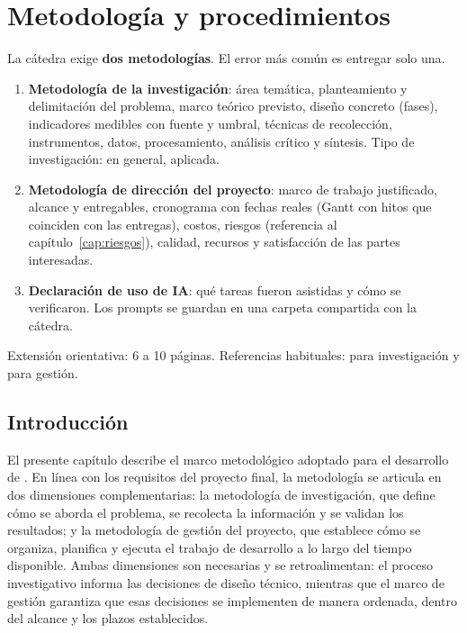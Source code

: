 
\chapter{Metodología y procedimientos}\label{cap:metodologia}

\begin{guia}
La cátedra exige \textbf{dos metodologías}. El error más común es
entregar solo una.
\begin{enumerate}
    \item \textbf{Metodología de la investigación}: área temática,
          planteamiento y delimitación del problema, marco teórico
          previsto, diseño concreto (fases), indicadores medibles con
          fuente y umbral, técnicas de recolección, instrumentos, datos,
          procesamiento, análisis crítico y síntesis. Tipo de
          investigación: en general, aplicada.
    \item \textbf{Metodología de dirección del proyecto}: marco de trabajo
          justificado, alcance y entregables, cronograma con fechas reales
          (Gantt con hitos que coinciden con las entregas), costos, riesgos
          (referencia al capítulo~\ref{cap:riesgos}), calidad, recursos y
          satisfacción de las partes interesadas.
    \item \textbf{Declaración de uso de IA}: qué tareas fueron asistidas y
          cómo se verificaron. Los prompts se guardan en una carpeta
          compartida con la cátedra.
\end{enumerate}
Extensión orientativa: 6 a 10 páginas. Referencias habituales:
\citet{hernandezsampieri2014} para investigación y \citet{pmi2021}
para gestión.
\end{guia}

\section{Introducción}

El presente capítulo describe el marco metodológico adoptado para el
desarrollo de \sistema{}. En línea con los requisitos del proyecto
final, la metodología se articula en dos dimensiones complementarias:
la metodología de investigación, que define cómo se aborda el problema,
se recolecta la información y se validan los resultados; y la
metodología de gestión del proyecto, que establece cómo se organiza,
planifica y ejecuta el trabajo de desarrollo a lo largo del tiempo
disponible. Ambas dimensiones son necesarias y se retroalimentan: el
proceso investigativo informa las decisiones de diseño técnico, mientras
que el marco de gestión garantiza que esas decisiones se implementen de
manera ordenada, dentro del alcance y los plazos establecidos.

